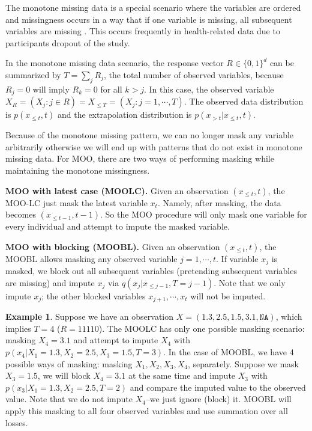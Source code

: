 \documentclass[aos, preprint]{imsart}
\theoremstyle{plain}
\theoremstyle{definition}
\newtheorem*{example}{Example}
\newcommand{\bX}{\mathbf{X}}
\newcommand{\bT}{\mathbf{T}}
\begin{document}
The monotone missing data is a special scenario where the variables are ordered and missingness occurs
in a way that if one variable is missing, all subsequent variables are missing \citep{little2019statistical}.
This occurs  frequently in health-related data due to participants dropout of the study. 

In the monotone missing data scenario, the response vector $R\in\{0,1\}^d$ can be summarized 
by $T = \sum_{j} R_j$, the total number of observed variables,
because $R_j = 0$ will imply $R_k = 0$ for all $k> j$. 
In this case, the observed variable
$X_R = (X_j : j \in R) = X_{\leq T} = (X_j: j=1,\cdots, T)$.
The observed data distribution is $p(x_{\leq t}, t)$
and the extrapolation distribution is $p(x_{>t}|x_{\leq t}, t).$




Because of the monotone missing pattern,
we can no longer mask any variable arbitrarily 
otherwise we will end up with patterns that do not exist in monotone missing data. 
For MOO, there are two  ways of performing masking while
maintaining the monotone missingness.




{\bf MOO with latest case (MOOLC).}
Given an observation $(x_{\leq t},t)$, the MOO-LC
just mask the latest variable $x_t$. 
Namely, after masking, the data becomes $(x_{\leq t-1}, t-1)$. 
So the MOO procedure will only mask one variable for every individual
and attempt to impute the masked variable. 

{\bf MOO with blocking (MOOBL).}
Given an observation $(x_{\leq t},t)$, the MOOBL
allows masking any observed variable $j =1,\cdots, t$.
If variable $x_j$ is masked,
we block out all subsequent variables (pretending subsequent variables are missing)
and impute $x_j$ via $q(x_j|x_{\leq j-1}, T= j-1).$
Note that we only impute $x_j$; the other blocked variables $x_{j+1},\cdots, x_{t}$ will not be imputed.



\begin{example}
Suppose we have an observation $X = (1.3, 2.5, 1.5, 3.1, \texttt{NA})$, which implies $T=4$ ($R=11110$).
The MOOLC has only one possible masking scenario: masking  $X_4= 3.1$
and attempt to impute $X_4$ with $p(x_4|X_1=1.3, X_2=2.5, X_3=1.5, T=3).$
In the case of MOOBL, we have 4 possible ways of masking: masking $X_1,X_2,X_3,X_4$, separately.
Suppose we mask $X_3=1.5$, we will  block $X_4=3.1$ at the same time
and impute $X_3$ with $p(x_3|X_1=1.3, X_2=2.5, T=2)$ and compare the imputed value to
the observed value. Note that we do not impute $X_4$--we just ignore (block) it. 
MOOBL will apply this masking to all four observed variables and
use summation over all losses.
\end{example}
\end{document}
